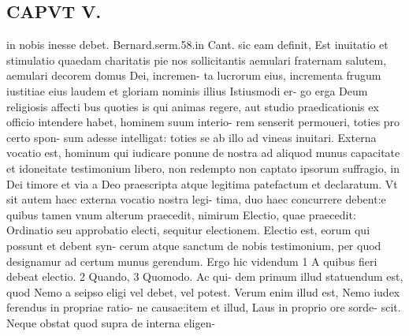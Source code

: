 \documentclass{article}
\begin{document}
\begin{pages}
\section*{CAPVT V. }
\marginpar{[ p.345 ]}\pstart in nobis inesse debet. Bernard.serm.58.in Cant. sic eam definit, Est inuitatio et stimulatio quaedam charitatis pie nos sollicitantis aemulari fraternam salutem, aemulari decorem domus Dei, incremen- ta lucrorum eius, incrementa frugum iustitiae eius laudem et gloriam nominis illius Istiusmodi er- go erga Deum religiosis affecti bus quoties is qui animas regere, aut studio praedicationis ex officio intendere habet, hominem suum interio- rem senserit permoueri, toties pro certo spon- sum adesse intelligat: toties se ab illo ad vineas inuitari.  \pend\pstart Externa vocatio est, hominum qui iudicare ponune de nostra ad aliquod munus capacitate et idoneitate testimonium libero, non redempto non captato ipsorum suffragio, in Dei timore et via a Deo praescripta atque legitima patefactum et declaratum.  \pend\pstart Vt sit autem haec externa vocatio nostra legi- tima, duo haec concurrere debent:e quibus tamen vnum alterum praecedit, nimirum Electio, quae praecedit: Ordinatio seu approbatio electi, sequitur electionem.  \pend\pstart Electio est, eorum qui possunt et debent syn- cerum atque sanctum de nobis testimonium, per quod designamur ad certum munus gerendum.  \pend\pstart Ergo hic videndum 1 A quibus fieri debeat electio. 2 Quando, 3 Quomodo. Ac qui- dem primum illud statuendum est, quod Nemo a seipso eligi vel debet, vel potest. Verum enim illud est, Nemo iudex ferendus in propriae ratio- ne causae:item et illud, Laus in proprio ore sorde- scit. Neque obstat quod supra de interna eligen-  \pend

\end{pages}
\end{document}
